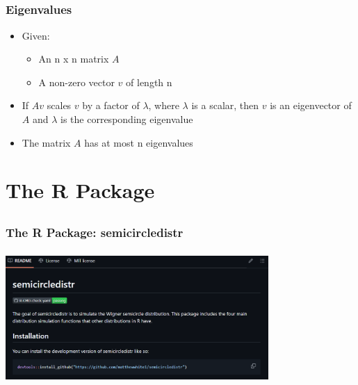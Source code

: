 \documentclass[handout, xcolor=dvipsnames]{beamer}
\begin{document}
\subsection{}
\begin{frame}
	\frametitle{Eigenvalues}
        \begin{itemize}
            \item Given:
            \begin{itemize}
                \item An n x n matrix $A$
                \item A non-zero vector $v$ of length n
            \end{itemize}
            \item If $Av$ scales $v$ by a factor of $\lambda$, where $\lambda$ is a scalar, then $v$ is an eigenvector of $A$ and $\lambda$ is the corresponding eigenvalue
            \item The matrix $A$ has at most n eigenvalues
        \end{itemize}
\end{frame}


\section{The R Package}  


\subsection{}
\begin{frame}
	\frametitle{The R Package: semicircledistr}
        \begin{center}
            \includegraphics[width=10cm,height=5cm]{Figures/README_top.png}
        \end{center}
\end{frame}
\end{document}
